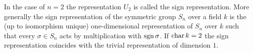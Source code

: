 \begin{rem}
 In the case of $n = 2$ the representation $U_2$ is called the sign representation. More generally the sign representation of the symmetric group $S_n$ over a field $k$ is the (up to isomorphism unique) one-dimensional representation of $S_n$ over $k$ such that every $\sigma \in S_n$ acts by multiplication with $\operatorname{sgn} \sigma$. If $\operatorname{char} k = 2$ the sign representation coincides with the trivial representation of dimension $1$.
\end{rem}




